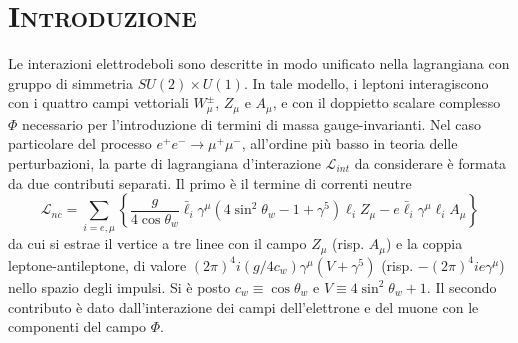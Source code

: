\documentclass[11pt]{article}
\begin{document}
    \section{\centering\textsc{Introduzione} } %
    Le interazioni elettrodeboli sono descritte in modo unificato nella lagrangiana con gruppo di simmetria $SU(2)\times U(1)$. In tale modello, i leptoni interagiscono con i quattro campi vettoriali
    $W^\pm_\mu$, $Z_\mu$ e $A_\mu$, e con il doppietto scalare complesso $\Phi$ necessario per l'introduzione di termini di massa gauge-invarianti. Nel caso particolare del processo $e^+e^-\to\mu^+\mu^-$, all'ordine più basso in teoria delle perturbazioni, 
    la parte di lagrangiana d'interazione $\mathcal{L}_{int}$ da considerare è formata da due contributi separati. Il primo è il termine di correnti neutre
    \begin{equation}
    \mathcal{L}_{nc}=\sum_{i=e,\mu}\left\{\frac{g}{4\cos\theta_w}\bar{\ell}_i\gamma^\mu(4\sin^2\theta_w-1+\gamma^5)\ell_iZ_\mu-e\bar{\ell}_i\gamma^\mu\ell_iA_\mu\right\}
    \end{equation}
    da cui si estrae il vertice a tre linee con il campo $Z_\mu$ (risp. $A_\mu$) e la coppia leptone-antileptone, di valore $(2\pi)^4i(g/4c_w)\gamma^\mu(V+\gamma^5)$ (risp. $-(2\pi)^4ie\gamma^\mu$) nello spazio degli impulsi. Si è posto $c_w\equiv\cos\theta_w$ e $V\equiv4\sin^2\theta_w+1$.
    Il secondo contributo è dato dall'interazione dei campi dell'elettrone e del muone con le componenti del campo $\Phi$.

\end{document}
